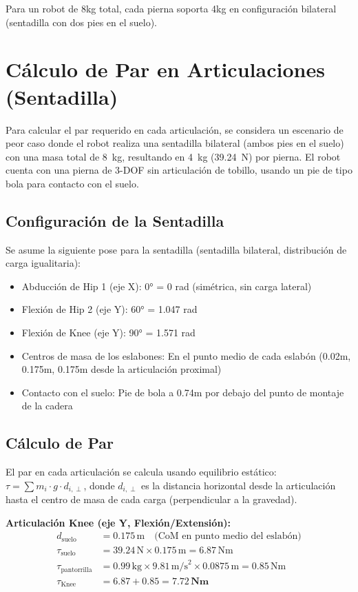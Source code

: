 Para un robot de 8kg total, cada pierna soporta 4kg en configuración bilateral (sentadilla con dos pies en el suelo).

\section{Cálculo de Par en Articulaciones (Sentadilla)}

Para calcular el par requerido en cada articulación, se considera un escenario de peor caso donde el robot realiza una sentadilla bilateral (ambos pies en el suelo) con una masa total de \SI{8}{kg}, resultando en \SI{4}{kg} (\SI{39.24}{N}) por pierna. El robot cuenta con una pierna de 3-DOF sin articulación de tobillo, usando un pie de tipo bola para contacto con el suelo.

\subsection{Configuración de la Sentadilla}

Se asume la siguiente pose para la sentadilla (sentadilla bilateral, distribución de carga igualitaria):

\begin{itemize}
    \item Abducción de Hip 1 (eje X): 0° = 0 rad (simétrica, sin carga lateral)
    \item Flexión de Hip 2 (eje Y): 60° = 1.047 rad
    \item Flexión de Knee (eje Y): 90° = 1.571 rad
    \item Centros de masa de los eslabones: En el punto medio de cada eslabón (0.02m, 0.175m, 0.175m desde la articulación proximal)
    \item Contacto con el suelo: Pie de bola a 0.74m por debajo del punto de montaje de la cadera
\end{itemize}

\subsection{Cálculo de Par}

El par en cada articulación se calcula usando equilibrio estático: $\tau = \sum m_i \cdot g \cdot d_{i,\perp}$, donde $d_{i,\perp}$ es la distancia horizontal desde la articulación hasta el centro de masa de cada carga (perpendicular a la gravedad).

\textbf{Articulación Knee (eje Y, Flexión/Extensión):}
\begin{align*}
d_{\text{suelo}} &= 0.175\,\text{m} \quad \text{(CoM en punto medio del eslabón)} \\
\tau_{\text{suelo}} &= 39.24\,\text{N} \times 0.175\,\text{m} = 6.87\,\text{Nm} \\
\tau_{\text{pantorrilla}} &= 0.99\,\text{kg} \times 9.81\,\text{m/s}^2 \times 0.0875\,\text{m} = 0.85\,\text{Nm} \\
\tau_{\text{Knee}} &= 6.87 + 0.85 = \mathbf{7.72\,\text{Nm}}
\end{align*}

